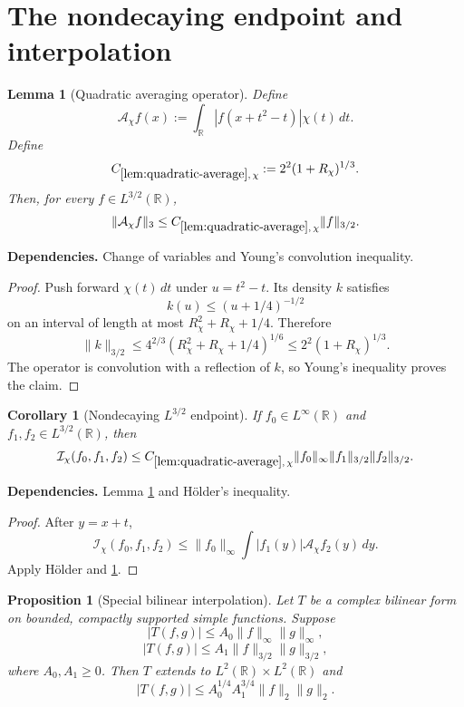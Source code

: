 \documentclass[11pt]{article}
\newtheorem{proposition}[proposition]{Proposition}
\newtheorem{lemma}[lemma]{Lemma}
\newtheorem{corollary}[corollary]{Corollary}
\theoremstyle{definition}
\theoremstyle{remark}
\newcommand{\R}{\mathbb R}
\newcommand{\1}{\mathbf 1}
\newcommand{\dd}{\,d}
\newcommand{\Ichi}{\mathcal I_{\chi}}
\newcommand{\lpNorm}[2]{\lVert #1\rVert_{#2}}
\newcommand{\uses}[1]{\par\smallskip\noindent\textbf{Dependencies.} #1\par\smallskip}
\begin{document}
\section{The nondecaying endpoint and interpolation}

\begin{lemma}[Quadratic averaging operator]\label{lem:quadratic-average}
Define
\[
\mathcal A_\chi f(x):=\int_\R|f(x+t^2-t)|\chi(t)\dd t.
\]
Define
\[
C_{\ref{lem:quadratic-average},\,\chi}
:=
2^2(1+R_\chi)^{1/3}.
\]
Then, for every $f\in L^{3/2}(\R)$,
\[
\lpNorm{\mathcal A_\chi f}3
\leq
C_{\ref{lem:quadratic-average},\,\chi}\lpNorm f{3/2}.
\]
\end{lemma}

\uses{Change of variables and Young's convolution inequality.}

\begin{proof}
Push forward $\chi(t)\dd t$ under $u=t^2-t$.  Its density $k$ satisfies
\[
k(u)\leq(u+1/4)^{-1/2}
\]
on an interval of length at most $R_\chi^2+R_\chi+1/4$.  Therefore
\[
\lpNorm k{3/2}
\leq
4^{2/3}(R_\chi^2+R_\chi+1/4)^{1/6}
\leq
2^2(1+R_\chi)^{1/3}.
\]
The operator is convolution with a reflection of $k$, so Young's inequality proves the claim.
\end{proof}

\begin{corollary}[Nondecaying $L^{3/2}$ endpoint]\label{cor:l32-endpoint}
If $f_0\in L^\infty(\R)$ and $f_1,f_2\in L^{3/2}(\R)$, then
\[
\Ichi(f_0,f_1,f_2)
\leq
C_{\ref{lem:quadratic-average},\,\chi}
\lpNorm{f_0}\infty\lpNorm{f_1}{3/2}\lpNorm{f_2}{3/2}.
\]
\end{corollary}

\uses{Lemma \ref{lem:quadratic-average} and H\"older's inequality.}

\begin{proof}
After $y=x+t$,
\[
\Ichi(f_0,f_1,f_2)
\leq
\lpNorm{f_0}\infty
\int|f_1(y)|\mathcal A_\chi f_2(y)\dd y.
\]
Apply H\"older and \cref{lem:quadratic-average}.
\end{proof}

\begin{proposition}[Special bilinear interpolation]\label{prop:special-interpolation}
Let $T$ be a complex bilinear form on bounded, compactly supported simple functions.  Suppose
\[
|T(f,g)|\leq A_0\lpNorm f\infty\lpNorm g\infty,
\]
\[
|T(f,g)|\leq A_1\lpNorm f{3/2}\lpNorm g{3/2},
\]
where $A_0,A_1\geq0$.  Then $T$ extends to $L^2(\R)\times L^2(\R)$ and
\[
|T(f,g)|\leq A_0^{1/4}A_1^{3/4}\lpNorm f2\lpNorm g2.
\]
\end{proposition}
\end{document}
